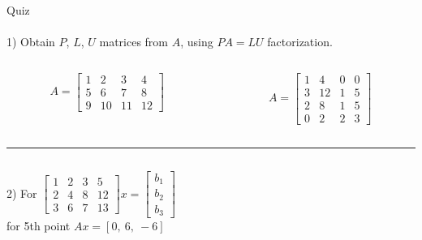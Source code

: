 \documentclass[aspectratio=169]{beamer}
\begin{document}
\begin{frame}[t]{Quiz}
    \framesubtitle{}
    \vspace{-0.3cm}
    1) Obtain $P$, $L$, $U$ matrices from $A$, using $PA=LU$ factorization.
    \begin{columns}[c,onlytextwidth]
        \begin{column}{0.49\textwidth}
            \begin{equation}
                A = \begin{bmatrix}
                    1 & 2  & 3  & 4  \\
                    5 & 6  & 7  & 8  \\
                    9 & 10 & 11 & 12
                \end{bmatrix}
            \end{equation}
        \end{column}
        \begin{column}{0.49\textwidth}
            \begin{equation}
                A = \begin{bmatrix}
                    1 & 4  & 0 & 0 \\
                    3 & 12 & 1 & 5 \\
                    2 & 8  & 1 & 5 \\
                    0 & 2  & 2 & 3
                \end{bmatrix}
            \end{equation}
        \end{column}
    \end{columns}
    \textcolor[RGB]{100,100,100}{\noindent\rule{\linewidth}{0.3pt}}
     \vspace{-0.8cm}
\begin{columns}[T,onlytextwidth]
    \begin{column}{0.3\textwidth}
        2) For $\begin{bmatrix}
            1 & 2 & 3 & 5  \\
            2 & 4 & 8 & 12 \\
            3 & 6 & 7 & 13
        \end{bmatrix} x = \begin{bmatrix}b_1\\b_2\\b_3\end{bmatrix}$ \\
        for 5th point $Ax=[0,\ 6,\ -6]$
    \end{column}

\end{columns}
\end{frame}
\end{document}
